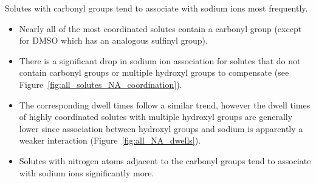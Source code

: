 \documentclass{article}
\begin{document}
  \noindent Solutes with carbonyl groups tend to associate with sodium ions most frequently.
  \begin{itemize}
    \item Nearly all of the most coordinated solutes contain a carbonyl group 
    (except for DMSO which has an analogous sulfinyl group). 
    \item There is a significant drop in sodium ion association for solutes 
    that do not contain carbonyl groups or multiple hydroxyl groups to compensate 
    (see Figure~\ref{fig:all_solutes_NA_coordination}).
    \item The corresponding dwell times follow a similar trend, however the dwell
    times of highly coordinated solutes with multiple hydroxyl groups are generally
    lower since association between hydroxyl groups and sodium is apparently a 
    weaker interaction (Figure~\ref{fig:all_NA_dwells}).
	\item Solutes with nitrogen atoms adjacent to the carbonyl groups tend to
	associate with sodium ions significantly more. 
  \end{itemize}
  
\end{document}

